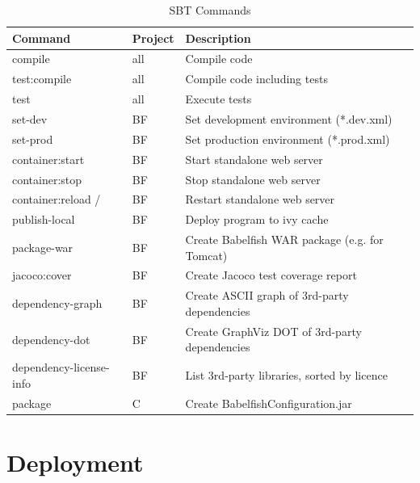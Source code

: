 \begin{table}[hp]
\begin{tabularx}{\textwidth}{llX}
\toprule
Command & Project & Description\\
\midrule
compile & all & Compile code\\
test:compile & all & Compile code including tests\\
test & all & Execute tests\\
set-dev & BF & Set development environment (*.dev.xml)\\
set-prod & BF & Set production environment (*.prod.xml)\\
container:start & BF & Start standalone web server\\
container:stop & BF & Stop standalone web server\\
container:reload /& BF & Restart standalone web server\\
publish-local & BF & Deploy program to ivy cache\\
package-war	& BF & Create Babelfish WAR package (e.g. for Tomcat)\\
jacoco:cover & BF & Create Jacoco test coverage report\\
dependency-graph & BF & Create ASCII graph of 3rd-party dependencies\\
dependency-dot & BF & Create GraphViz DOT of 3rd-party dependencies\\
dependency-license-info & BF & List 3rd-party libraries, sorted by licence\\
package & C & Create BabelfishConfiguration.jar\\
\bottomrule
\end{tabularx}
\caption{SBT Commands}\label{tab:sbtCommands}
\end{table}

\chapter{Deployment}\label{sec:deployment}
